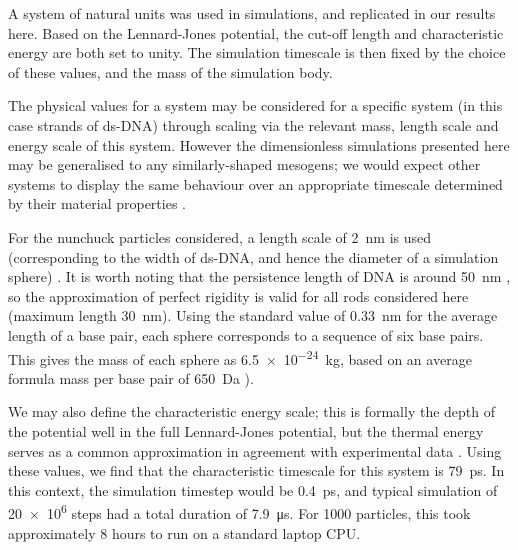 \documentclass[11pt, a4paper]{article} %
\begin{document}
A system of natural units was used in simulations, and replicated in our results here. Based on the Lennard-Jones potential, the cut-off length and characteristic energy are both set to unity. The simulation timescale is then fixed by the choice of these values, and the mass of the simulation body. 

The physical values for a system may be considered for a specific system (in this case strands of ds-DNA) through scaling via the relevant mass, length scale and energy scale of this system. However the dimensionless simulations presented here may be generalised to any similarly-shaped mesogens; we would expect other systems to display the same behaviour over an appropriate timescale determined by their material properties \cite{Rapaport2004}.

For the nunchuck particles considered, a length scale of \SI{2}{\nano\metre} is used (corresponding to the width of ds-DNA, and hence the diameter of a simulation sphere) \cite{Arnott1972}. It is worth noting that the persistence length of DNA is around \SI{50}{\nano\metre} \cite{Garcia2007}, so the approximation of perfect rigidity is valid for all rods considered here (maximum length \SI{30}{\nano\metre}). Using the standard value of \SI{0.33}{\nano\metre} \cite{Langridge1960} for the average length of a base pair, each sphere corresponds to a sequence of six base pairs. This gives the mass of each sphere as \SI{6.5e-24}{\kilogram}, based on an average formula mass per base pair of \SI{650}{\dalton} \cite{Duewer2018}). 

We may also define the characteristic energy scale; this is formally the depth of the potential well in the full Lennard-Jones potential, but the thermal energy serves as a common approximation \cite{Pan2010} in agreement with experimental data \cite{Wang2002}. Using these values, we find that the characteristic timescale for this system is \SI{79}{\pico\second}. In this context, the simulation timestep would be \SI{0.4}{\pico\second}, and typical simulation of \num{20e6} steps had a total duration of \SI{7.9}{\micro\second}. For \num{1000} particles, this took approximately $8$ hours to run on a standard laptop CPU. %
\end{document}
